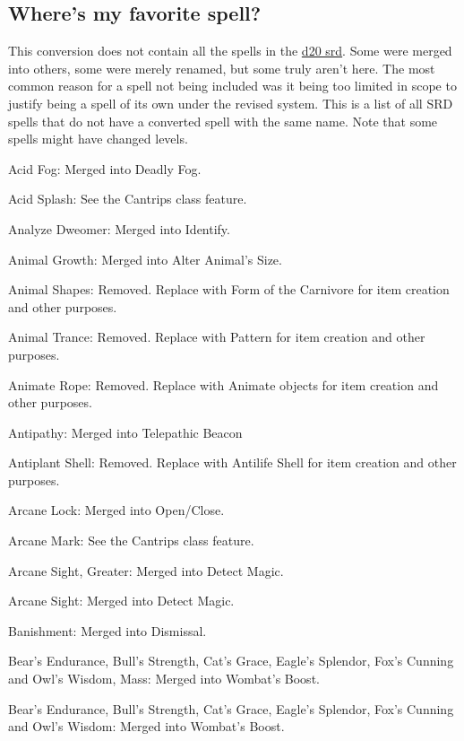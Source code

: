 \newpage
\subsection{Where's my favorite spell?}
\label{sec:MissingSpells}
This conversion does not contain all the spells in the \href{http://www.wizards.com/default.asp?x=d20/article/srd35}{d20 srd}.
Some were merged into others, some were merely renamed, but some truly aren't here. 
The most common reason for a spell not being included was it being too limited in scope to justify being a spell of its own under the revised system.
This is a list of all SRD spells that do not have a converted spell with the same name.
Note that some spells might have changed levels.
{\small
\begin{list}{}{\leftmargin=1em}
 \item Acid Fog: Merged into Deadly Fog.
 \item Acid Splash: See the Cantrips class feature.
 \item Analyze Dweomer: Merged into Identify.
 \item Animal Growth: Merged into Alter Animal's Size.
 \item Animal Shapes: Removed. Replace with Form of the Carnivore for item creation and other purposes.
 \item Animal Trance: Removed. Replace with Pattern for item creation and other purposes.
 \item Animate Rope: Removed. Replace with Animate objects for item creation and other purposes.
 \item Antipathy: Merged into Telepathic Beacon
 \item Antiplant Shell: Removed. Replace with Antilife Shell for item creation and other purposes.
 \item Arcane Lock: Merged into Open/Close.
 \item Arcane Mark: See the Cantrips class feature.
 \item Arcane Sight, Greater: Merged into Detect Magic.
 \item Arcane Sight: Merged into Detect Magic.
 \item Banishment: Merged into Dismissal.
 \item Bear's Endurance, Bull's Strength, Cat's Grace, Eagle's Splendor, Fox's Cunning and Owl's Wisdom, Mass: Merged into Wombat's Boost.
 \item Bear's Endurance, Bull's Strength, Cat's Grace, Eagle's Splendor, Fox's Cunning and Owl's Wisdom: Merged into Wombat's Boost.

\end{list}}
